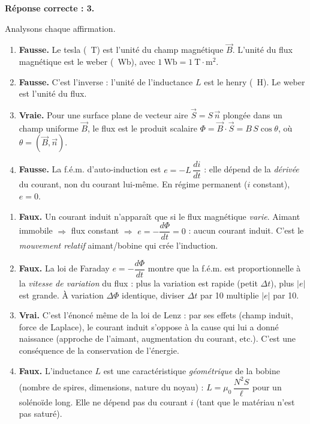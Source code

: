 \documentclass[11pt]{article}
\newcommand{\cle}[1]{{\popxbold\color{popdark}#1}}
\begin{document}
\begin{corrige}
\textbf{Réponse correcte : 3.}

Analysons chaque affirmation.
\begin{enumerate}
    \item \textbf{Fausse.} Le tesla (\SI{}{\tesla}) est l'unité du \cle{champ magnétique} $\vec{B}$. L'unité du flux magnétique est le \cle{weber} (\SI{}{\weber}), avec $1\ \mathrm{Wb} = 1\ \mathrm{T}\cdot\mathrm{m}^2$.
    \item \textbf{Fausse.} C'est l'inverse : l'unité de l'inductance $L$ est le \cle{henry} (\SI{}{\henry}). Le weber est l'unité du flux.
    \item \textbf{Vraie.} Pour une surface plane de vecteur aire $\vec{S} = S\,\vec{n}$ plongée dans un champ uniforme $\vec{B}$, le flux est le produit scalaire $\Phi = \vec{B}\cdot\vec{S} = B\,S\cos\theta$, où $\theta = (\vec{B},\vec{n})$.
    \item \textbf{Fausse.} La f.é.m. d'auto-induction est $e = -L\,\dfrac{di}{dt}$ : elle dépend de la \emph{dérivée} du courant, non du courant lui-même. En régime permanent ($i$ constant), $e = 0$.
\end{enumerate}
\end{corrige}

\begin{corrige}
\begin{enumerate}
    \item \textbf{Faux.} Un courant induit n'apparaît que si le flux magnétique \emph{varie}. Aimant immobile $\Rightarrow$ flux constant $\Rightarrow$ $e = -\dfrac{d\Phi}{dt} = 0$ : aucun courant induit. C'est le \emph{mouvement relatif} aimant/bobine qui crée l'induction.
    \item \textbf{Faux.} La loi de Faraday $e = -\dfrac{d\Phi}{dt}$ montre que la f.é.m. est proportionnelle à la \emph{vitesse de variation} du flux : plus la variation est rapide (petit $\Delta t$), plus $|e|$ est grande. À variation $\Delta\Phi$ identique, diviser $\Delta t$ par 10 multiplie $|e|$ par 10.
    \item \textbf{Vrai.} C'est l'énoncé même de la \cle{loi de Lenz} : par ses effets (champ induit, force de Laplace), le courant induit s'oppose à la cause qui lui a donné naissance (approche de l'aimant, augmentation du courant, etc.). C'est une conséquence de la conservation de l'énergie.
    \item \textbf{Faux.} L'inductance $L$ est une caractéristique \emph{géométrique} de la bobine (nombre de spires, dimensions, nature du noyau) : $L = \mu_0\,\dfrac{N^2 S}{\ell}$ pour un solénoïde long. Elle ne dépend pas du courant $i$ (tant que le matériau n'est pas saturé).
\end{enumerate}
\end{corrige}
\end{document}
